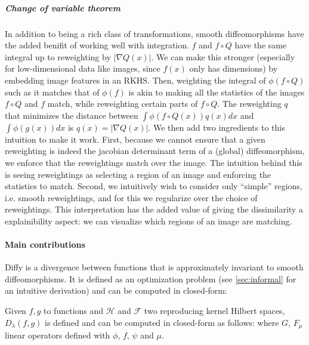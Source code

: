 \subparagraph{Change of variable theorem}
In addition to being a rich class of transformations, smooth diffeomorphisms have the added benifit of working well with integration.
$f$ and $f \circ Q$ have the same integral up to reweighting by $\vert \nabla Q(x)\vert$. We can make this stronger (especially for low-dimensional data like images, since $f(x)$ only has dimensions) by embedding image features in an RKHS. Then, weighting the integral of $\phi(f \circ Q)$ such as it matches that of $\phi(f)$ is akin to making all the statistics of the images $f\circ Q$ and $f$ match, while reweighting certain parts of $f\circ Q$. The reweighting $q$ that minimizes the distance between $\int \phi(f\circ Q(x))q(x)dx$ and $\int \phi(g(x))dx$ is $q(x) = \vert \nabla Q(x)\vert$. We then add two ingredients to this intuition to make it work. First, because we cannot ensure that a given reweighting is indeed the jacobian determinant term of a (global) diffeomorphism, we enforce that the reweightings match over the image. The intuition behind this is seeing reweightings as selecting a region of an image and enforcing the statistics to match. Second, we intuitively wish to consider only ``simple'' regions, i.e. smooth reweightings, and for this we regularize over the choice of reweightings. This interpretation has the added value of giving the dissimilarity a explainibility aspect: we can visualize which regions of an image are matching.

\paragraph{Main contributions}
Diffy is a divergence between functions that is approximately invariant to smooth diffeomorphisms.
It is defined as an optimization problem (see \cref{sec:informal} for an intuitive derivation) and can be computed in closed-form:
\begin{mdframed}
\begin{informaltheorem}
Given $f, g$ to functions and $\mathcal H$ and $\mathcal F$ two reproducing kernel Hilbert spaces, $D_\lambda(f, g)$ is defined and can be computed in closed-form as follows:
where $G$, $F_\mu$ linear operators defined with $\phi$, $f$, $\psi$ and $\mu$.
\end{informaltheorem}
\end{mdframed}

